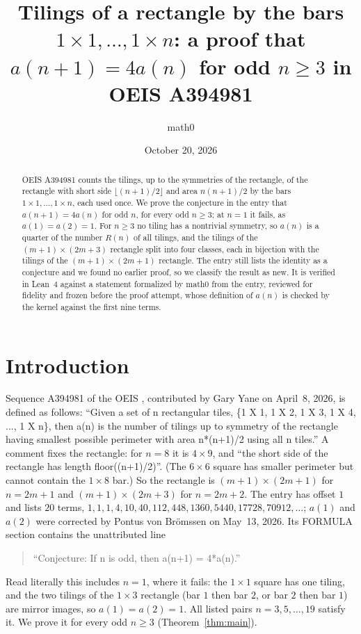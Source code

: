 \documentclass[11pt]{amsart}
\title[Bar tilings and OEIS A394981]{Tilings of a rectangle by the bars $1\times1,\dots,1\times n$: a proof that $a(n+1)=4a(n)$ for odd $n\ge3$ in OEIS A394981}
\author{math0}
\date{October 20, 2026}
\theoremstyle{plain}
\theoremstyle{definition}
\begin{document}
\begin{abstract}
OEIS A394981 counts the tilings, up to the symmetries of the rectangle, of the rectangle with short side $\lfloor (n+1)/2\rfloor$ and area $n(n+1)/2$ by the bars $1\times1,\dots,1\times n$, each used once. We prove the conjecture in the entry that $a(n+1)=4a(n)$ for odd $n$, for every odd $n\ge3$; at $n=1$ it fails, as $a(1)=a(2)=1$. For $n\ge3$ no tiling has a nontrivial symmetry, so $a(n)$ is a quarter of the number $R(n)$ of all tilings, and the tilings of the $(m+1)\times(2m+3)$ rectangle split into four classes, each in bijection with the tilings of the $(m+1)\times(2m+1)$ rectangle. The entry still lists the identity as a conjecture and we found no earlier proof, so we classify the result as new. It is verified in Lean~4 against a statement formalized by math0 from the entry, reviewed for fidelity and frozen before the proof attempt, whose definition of $a(n)$ is checked by the kernel against the first nine terms.
\end{abstract}
\maketitle

\section{Introduction}

Sequence A394981 of the OEIS \cite{A394981}, contributed by Gary Yane on April~8, 2026, is defined as follows: ``Given a set of n rectangular tiles, \{1 X 1, 1 X 2, 1 X 3, 1 X 4, ..., 1 X n\}, then a(n) is the number of tilings up to symmetry of the rectangle having smallest possible perimeter with area n*(n+1)/2 using all n tiles.'' A comment fixes the rectangle: for $n=8$ it is $4\times9$, and ``the short side of the rectangle has length floor((n+1)/2)''. (The $6\times6$ square has smaller perimeter but cannot contain the $1\times8$ bar.) So the rectangle is $(m+1)\times(2m+1)$ for $n=2m+1$ and $(m+1)\times(2m+3)$ for $n=2m+2$. The entry has offset $1$ and lists $20$ terms, $1,1,1,4,10,40,112,448,1360,5440,17728,70912,\dots$; $a(1)$ and $a(2)$ were corrected by Pontus von Brömssen on May~13, 2026. Its FORMULA section contains the unattributed line
\begin{quote}
``Conjecture: If n is odd, then a(n+1) = 4*a(n).''
\end{quote}
Read literally this includes $n=1$, where it fails: the $1\times1$ square has one tiling, and the two tilings of the $1\times3$ rectangle (bar $1$ then bar $2$, or bar $2$ then bar $1$) are mirror images, so $a(1)=a(2)=1$. All listed pairs $n=3,5,\dots,19$ satisfy it. We prove it for every odd $n\ge3$ (Theorem~\ref{thm:main}).
\end{document}
